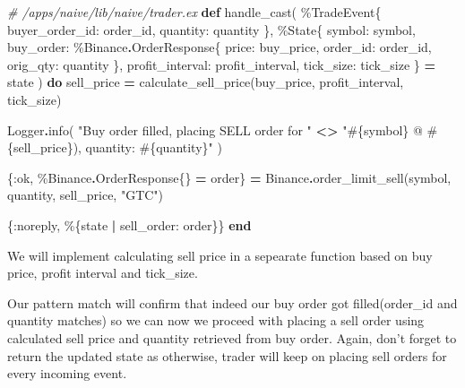 \documentclass[
]{book}
\newenvironment{Shaded}{\begin{snugshade}}{\end{snugshade}}
\newcommand{\CommentTok}[1]{\textcolor[rgb]{0.56,0.35,0.01}{\textit{#1}}}
\newcommand{\ConstantTok}[1]{\textcolor[rgb]{0.00,0.00,0.00}{#1}}
\newcommand{\KeywordTok}[1]{\textcolor[rgb]{0.13,0.29,0.53}{\textbf{#1}}}
\newcommand{\NormalTok}[1]{#1}
\newcommand{\OperatorTok}[1]{\textcolor[rgb]{0.81,0.36,0.00}{\textbf{#1}}}
\newcommand{\OtherTok}[1]{\textcolor[rgb]{0.56,0.35,0.01}{#1}}
\newcommand{\StringTok}[1]{\textcolor[rgb]{0.31,0.60,0.02}{#1}}
\newcommand{\VariableTok}[1]{\textcolor[rgb]{0.00,0.00,0.00}{#1}}
\begin{document}
\begin{Shaded}
\begin{Highlighting}[]
  \CommentTok{\# /apps/naive/lib/naive/trader.ex}
  \KeywordTok{def}\NormalTok{ handle\_cast(}
\NormalTok{        \%}\ConstantTok{TradeEvent}\NormalTok{\{}
          \VariableTok{buyer\_order\_id:}\NormalTok{ order\_id,}
          \VariableTok{quantity:}\NormalTok{ quantity}
\NormalTok{        \},}
\NormalTok{        \%}\ConstantTok{State}\NormalTok{\{}
          \VariableTok{symbol:}\NormalTok{ symbol,}
          \VariableTok{buy\_order:}\NormalTok{ \%}\ConstantTok{Binance}\OperatorTok{.}\ConstantTok{OrderResponse}\NormalTok{\{}
            \VariableTok{price:}\NormalTok{ buy\_price,}
            \VariableTok{order\_id:}\NormalTok{ order\_id,}
            \VariableTok{orig\_qty:}\NormalTok{ quantity}
\NormalTok{          \},}
          \VariableTok{profit\_interval:}\NormalTok{ profit\_interval,}
          \VariableTok{tick\_size:}\NormalTok{ tick\_size}
\NormalTok{        \} }\OperatorTok{=}\NormalTok{ state}
\NormalTok{      ) }\KeywordTok{do}
\NormalTok{    sell\_price }\OperatorTok{=}\NormalTok{ calculate\_sell\_price(buy\_price, profit\_interval, tick\_size)}

    \ConstantTok{Logger}\OperatorTok{.}\NormalTok{info(}
      \StringTok{"Buy order filled, placing SELL order for "} \OperatorTok{\textless{}\textgreater{}}
        \StringTok{"}\OtherTok{\#\{}\NormalTok{symbol}\OtherTok{\}}\StringTok{ @ }\OtherTok{\#\{}\NormalTok{sell\_price}\OtherTok{\}}\StringTok{), quantity: }\OtherTok{\#\{}\NormalTok{quantity}\OtherTok{\}}\StringTok{"}
\NormalTok{    )}

\NormalTok{    \{}\VariableTok{:ok}\NormalTok{, \%}\ConstantTok{Binance}\OperatorTok{.}\ConstantTok{OrderResponse}\NormalTok{\{\} }\OperatorTok{=}\NormalTok{ order\} }\OperatorTok{=}
      \ConstantTok{Binance}\OperatorTok{.}\NormalTok{order\_limit\_sell(symbol, quantity, sell\_price, }\StringTok{"GTC"}\NormalTok{)}

\NormalTok{    \{}\VariableTok{:noreply}\NormalTok{, \%\{state }\OperatorTok{|} \VariableTok{sell\_order:}\NormalTok{ order\}\}}
  \KeywordTok{end}
\end{Highlighting}
\end{Shaded}

We will implement calculating sell price in a sepearate function based on buy price, profit interval and tick\_size.

Our pattern match will confirm that indeed our buy order got filled(order\_id and quantity matches) so we can now we proceed with placing a sell order using calculated sell price and quantity retrieved from buy order.
Again, don't forget to return the updated state as otherwise, trader will keep on placing sell orders for every incoming event.
\end{document}
